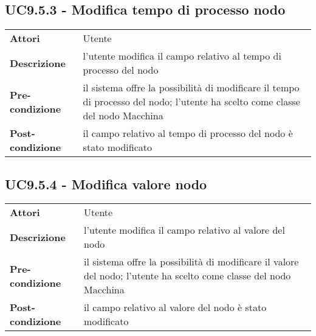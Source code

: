 \subsection{UC9.5.3 - Modifica tempo di processo nodo}
\label{sssec:UC9.5.3}
\def\arraystretch{1.5}
\begin{tabularx}{\textwidth}{l|p{}}
\rowcolor{I} \multicolumn{2}{c}{\color{white}\textbf{UC9.5.3 - Modifica tempo di processo nodo}} \\
\toprule
\endhead
\textbf{Attori} & Utente\\
\textbf{Descrizione} & l'utente modifica il campo relativo al tempo di processo del nodo\\
\textbf{Pre-condizione} & il sistema offre la possibilità di modificare il tempo di processo del nodo; l'utente ha scelto come classe del nodo Macchina\\
\textbf{Post-condizione} & il campo relativo al tempo di processo del nodo è stato modificato\\
\bottomrule
\end{tabularx}
\subsection{UC9.5.4 - Modifica valore nodo}
\label{sssec:UC9.5.4}
\def\arraystretch{1.5}
\begin{tabularx}{\textwidth}{l|p{}}
\rowcolor{I} \multicolumn{2}{c}{\color{white}\textbf{UC9.5.4 - Modifica valore nodo}} \\
\toprule
\endhead
\textbf{Attori} & Utente\\
\textbf{Descrizione} & l'utente modifica il campo relativo al valore del nodo\\
\textbf{Pre-condizione} & il sistema offre la possibilità di modificare il valore del nodo; l'utente ha scelto come classe del nodo Macchina\\
\textbf{Post-condizione} & il campo relativo al valore del nodo è stato modificato\\
\bottomrule
\end{tabularx}

